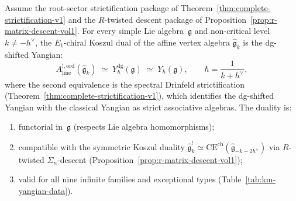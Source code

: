 \begin{theorem}
\label{thm:km-yangian}
Assume the root-sector strictification package of
Theorem~\textup{\ref{thm:complete-strictification-v1}} and the
$R$-twisted descent package of
Proposition~\textup{\ref{prop:r-matrix-descent-vol1}}.
For every simple Lie algebra~$\mathfrak{g}$ and non-critical
level $k\neq -h^\vee$, the $E_1$-chiral Koszul dual of the
affine vertex algebra $\widehat{\mathfrak{g}}_k$ is the
dg-shifted Yangian:
\begin{equation}\label{eq:km-yangian-duality}
A^{!,\mathrm{ord}}_{\mathrm{line}}
(\widehat{\mathfrak{g}}_k)
\;\simeq\;
Y^{\mathrm{dg}}_\hbar(\mathfrak{g})
\;\simeq\;
Y_\hbar(\mathfrak{g}),
\qquad
\hbar = \frac{1}{k+h^\vee},
\end{equation}
where the second equivalence is the spectral Drinfeld
strictification
\textup{(}Theorem~\ref{thm:complete-strictification-v1}\textup{)},
which identifies the dg-shifted Yangian with the classical
Yangian as strict associative algebras.
The duality is:
\begin{enumerate}[label=\textup{(\arabic*)}]
\item functorial in~$\mathfrak{g}$
\textup{(}respects Lie algebra homomorphisms\textup{)};

\item compatible with the symmetric Koszul duality
$\widehat{\mathfrak{g}}_k^!\simeq
\mathrm{CE}^{\mathrm{ch}}(\widehat{\mathfrak{g}}_{-k-2h^\vee})$
via $R$-twisted $\Sigma_n$-descent
\textup{(}Proposition~\textup{\ref{prop:r-matrix-descent-vol1})};

\item valid for all nine infinite families and
exceptional types \textup{(}Table~\textup{\ref{tab:km-yangian-data})}.
\end{enumerate}
\end{theorem}


